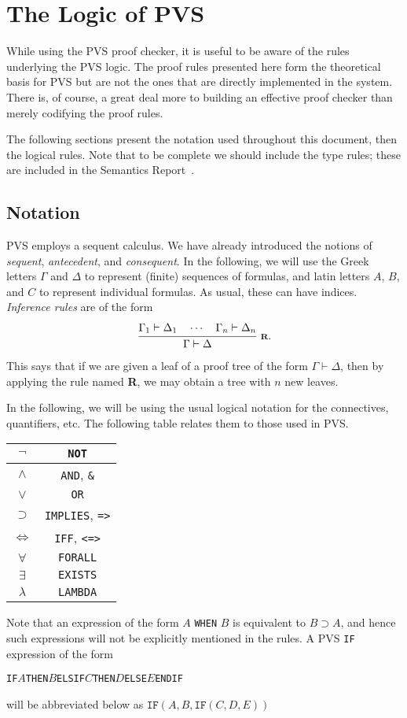 \documentclass[12pt]{book}
\newcommand{\Infrule}[3]{
{{\displaystyle\strut #1}\over{\displaystyle\strut #2}}\;\mbox{\scriptsize$\bf #3$}
}
\begin{document}
\chapter{The Logic of PVS} 
\label{logic}


While using the PVS proof checker, it is useful to be aware of the
rules underlying the PVS logic.  The proof rules presented here
form the theoretical basis for PVS but are not the ones that
are directly implemented in the system.   There is, of course,
a great deal more to building an effective proof checker than merely
codifying the proof rules.

The following sections present the notation used throughout this
document, then the logical rules.  Note that to be complete we should
include the type rules; these are included in the Semantics
Report~\cite{PVS:semantics}.

\section{Notation}

PVS employs a sequent calculus.  We have already introduced the
notions of \emph{sequent}, \emph{antecedent}, and \emph{consequent}.
In the following, we will use the Greek letters $\Gamma$ and $\Delta$ to
represent (finite) sequences of formulas, and latin letters $A$, $B$, and
$C$ to represent individual formulas.  As usual, these can have indices.
\emph{Inference rules} are of the form
$$\Infrule{\Gamma_1\vdash\Delta_1\quad\cdots\quad\Gamma_n\vdash\Delta_n}
{\Gamma\vdash\Delta}{R}.$$ This says that if we are given a leaf of a
proof tree of the form $\Gamma\vdash\Delta$, then by applying the rule
named {\bf R}, we may obtain a tree with $n$ new leaves.

In the following, we will be using the usual logical notation for the
connectives, quantifiers, etc.  The following table relates them to
those used in PVS.\@

\begin{center}
\begin{tabular}{|c|c|}\hline
$\neg$ & \texttt{NOT}\\\hline
$\wedge$ & \texttt{AND}, \texttt{\&}\\\hline
$\vee$ & \texttt{OR}\\\hline
$\supset$ & \texttt{IMPLIES}, \texttt{=>}\\\hline
$\iff$ & \texttt{IFF}, \texttt{<=>}\\\hline
$\forall$ & \texttt{FORALL}\\\hline
$\exists$ & \texttt{EXISTS}\\\hline
$\lambda$ & \texttt{LAMBDA}\\\hline
\end{tabular}
\end{center}
Note that an expression of the form $A$ \texttt{WHEN} $B$ is equivalent to
$B\supset A$, and hence such expressions will not be explicitly
mentioned in the rules.  A PVS \texttt{IF} expression of the form
\begin{alltt}
  IF \(A\) THEN \(B\) ELSIF \(C\) THEN \(D\) ELSE \(E\) ENDIF
\end{alltt}
will be abbreviated  below as $\texttt{IF}(A,B,\texttt{IF}(C,D,E))$
\end{document}
